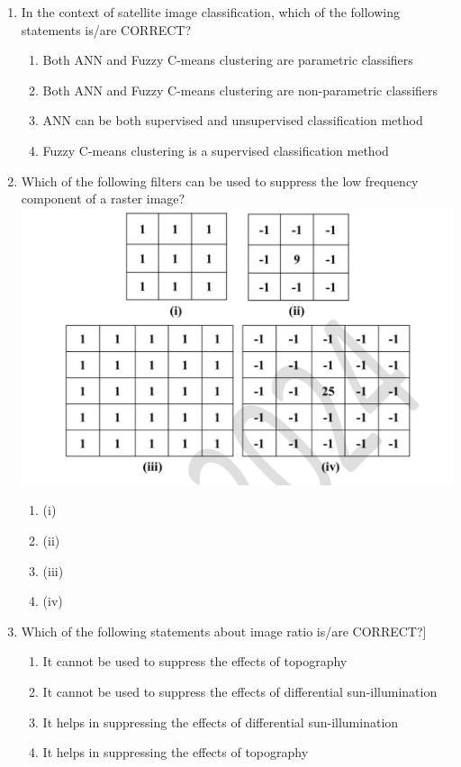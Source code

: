 \documentclass[12pt]{article}
\begin{document}
\begin{enumerate}
\item In the context of satellite image classification, which of the following statements
is/are CORRECT? 
\begin{enumerate}
    \item Both ANN and Fuzzy C-means clustering are parametric classifiers 
   \item Both ANN and Fuzzy C-means clustering are non-parametric classifiers 
   \item ANN can be both supervised and unsupervised classification method 
   \item Fuzzy C-means clustering is a supervised classification method
\end{enumerate}

\item Which of the following filters can be used to suppress the low frequency component
of a raster image? \\

\includegraphics[scale = 0.7]{Figs/LatexImage11.png} \\

 \begin{enumerate}
     \item(i) 
   \item (ii) 
   \item (iii) 
   \item (iv)
 \end{enumerate}

\item Which of the following statements about image ratio is/are CORRECT?]\\


\begin{enumerate}
    \item It cannot be used to suppress the effects of topography 
   \item It cannot be used to suppress the effects of differential sun-illumination 
   \item It helps in suppressing the effects of differential sun-illumination 
   \item It helps in suppressing the effects of topography 
\end{enumerate}


\end{enumerate}
\end{document}
